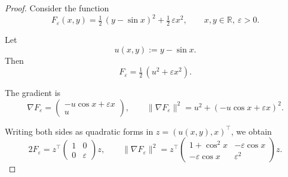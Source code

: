 \documentclass[10pt,a4paper]{amsart}
\def\R{{\mathbb{R}}}
\begin{document}
\begin{proof}
    Consider the function
\[
F_{\varepsilon}(x,y)=\tfrac12\,(y-\sin x)^2+\tfrac12\,\varepsilon x^2,
\qquad x,y\in\R,\ \varepsilon>0.
\]

Let
\[
u(x,y) := y - \sin x.
\]
Then
\[
F_{\varepsilon}=\tfrac12\,(u^2+\varepsilon x^2).
\]

The gradient is
\[
\nabla F_{\varepsilon}=
\begin{pmatrix}
-u\cos x + \varepsilon x\\[3pt]
u
\end{pmatrix},
\qquad
\|\nabla F_{\varepsilon}\|^2 = u^2 + (-u\cos x + \varepsilon x)^2.
\]


Writing both sides as quadratic forms in \(z=(u(x,y),x)^\top\), we obtain
\[
2F_{\varepsilon}
= z^\top 
\begin{pmatrix}
1 & 0\\[3pt]
0 & \varepsilon
\end{pmatrix}z,
\qquad
\|\nabla F_{\varepsilon}\|^2
= z^\top
\begin{pmatrix}
1+\cos^2 x & -\varepsilon\cos x\\[3pt]
-\varepsilon\cos x & \varepsilon^2
\end{pmatrix}z.
\]


\end{proof}
\end{document}
